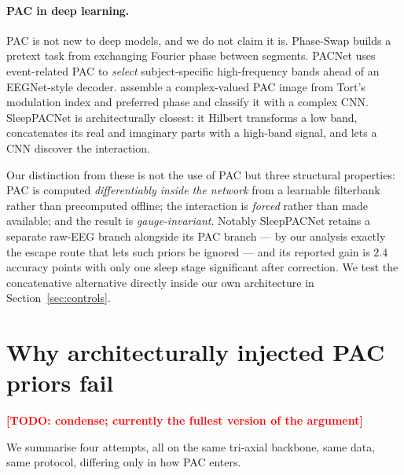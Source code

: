\documentclass{article}
\newcommand{\todo}[1]{\textcolor{red}{\textbf{[TODO: #1]}}}
\begin{document}
\paragraph{PAC in deep learning.}
PAC is not new to deep models, and we do not claim it is. Phase-Swap
\citep{lemkhenter2020phaseswap} builds a pretext task from exchanging Fourier
phase between segments. PACNet \citep{li2023pacnet} uses event-related PAC to
\emph{select} subject-specific high-frequency bands ahead of an EEGNet-style
decoder. \citet{li2023complexpac} assemble a complex-valued PAC image from Tort's
modulation index and preferred phase and classify it with a complex CNN.
SleepPACNet \citep{lee2026sleeppacnet} is architecturally closest: it Hilbert
transforms a low band, concatenates its real and imaginary parts with a
high-band signal, and lets a CNN discover the interaction.

Our distinction from these is not the use of PAC but three structural properties:
PAC is computed \emph{differentiably inside the network} from a learnable
filterbank rather than precomputed offline; the interaction is \emph{forced}
rather than made available; and the result is \emph{gauge-invariant}. Notably
SleepPACNet retains a separate raw-EEG branch alongside its PAC branch --- by our
analysis exactly the escape route that lets such priors be ignored --- and its
reported gain is $2.4$ accuracy points with only one sleep stage significant
after correction. We test the concatenative alternative directly inside our own
architecture in Section~\ref{sec:controls}.

\section{Why architecturally injected PAC priors fail}
\label{sec:whyfail}

\todo{condense; currently the fullest version of the argument}

We summarise four attempts, all on the same tri-axial backbone, same data, same
protocol, differing only in how PAC enters.
\end{document}
